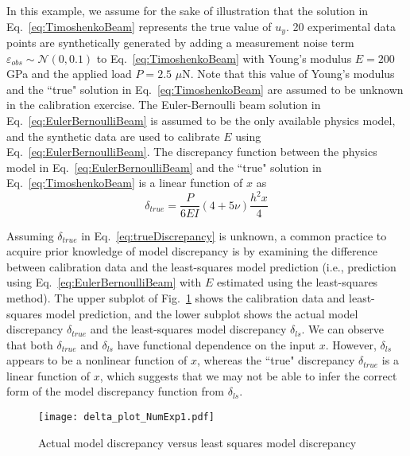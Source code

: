 \documentclass[preprint,review,12pt,3p]{elsarticle}
\begin{document}
In this example, we assume for the sake of illustration that the solution in Eq.~\ref{eq:TimoshenkoBeam} represents the true value of $u_y$. 20 experimental data points are synthetically generated by adding a measurement noise term $\varepsilon_{obs} \sim \mathcal{N}(0,0.1)$ to Eq.~\ref{eq:TimoshenkoBeam} with Young's modulus $E=200$ GPa and the applied load $P=2.5$ $\mu$N. Note that this value of Young's modulus and the ``true" solution in Eq.~\ref{eq:TimoshenkoBeam} are assumed to be unknown in the calibration exercise. The Euler-Bernoulli beam solution in Eq.~\ref{eq:EulerBernoulliBeam} is assumed to be the only available physics model, and the synthetic data are used to calibrate $E$ using Eq.~\ref{eq:EulerBernoulliBeam}. The discrepancy function between the physics model in Eq.~\ref{eq:EulerBernoulliBeam} and the ``true" solution in Eq.~\ref{eq:TimoshenkoBeam} is a linear function of $x$ as
\begin{equation}\label{eq:trueDiscrepancy}
\delta_{true} = \frac{P}{6EI} (4+5\nu)\frac{h^2 x}{4}
\end{equation}

Assuming $\delta_{true}$ in Eq.~\ref{eq:trueDiscrepancy} is unknown, a common practice to acquire prior knowledge of model discrepancy is by examining the difference between calibration data and the least-squares model prediction (i.e., prediction using Eq.~\ref{eq:EulerBernoulliBeam} with $E$ estimated using the least-squares method). The upper subplot of Fig.~\ref{figure:discrepancyPlot} shows the calibration data and least-squares model prediction, and the lower subplot shows the actual model discrepancy $\delta_{true}$ and the least-squares model discrepancy $\delta_{ls}$. We can observe that both $\delta_{true}$ and $\delta_{ls}$ have functional dependence on the input $x$. However, $\delta_{ls}$ appears to be a nonlinear function of $x$, whereas the ``true" discrepancy $\delta_{true}$ is a linear function of $x$, which suggests that we may not be able to infer the correct form of the model discrepancy function from $\delta_{ls}$.

\begin{figure}[h!]
\centering
\texttt{[image: delta\_plot\_NumExp1.pdf]}
\caption{Actual model discrepancy versus least squares model discrepancy}
\label{figure:discrepancyPlot}
\end{figure}
\end{document}
